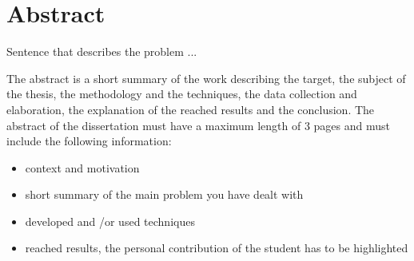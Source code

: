\chapter*{Abstract} %
\label{abstract}

\vspace{0.5 cm} 

Sentence that describes the problem ...

	The abstract is a short summary of the work describing the target, the subject of the thesis, the methodology 
and the techniques, the data collection and elaboration, the explanation of the reached results and the conclusion.
The abstract of the dissertation must have a maximum length of 3 pages and must include the following information: 

\begin{itemize}
  \item context and motivation
  \item short summary of the main problem you have dealt with
  \item developed and /or used techniques
  \item reached results, the personal contribution of the student has to be highlighted
\end{itemize}
